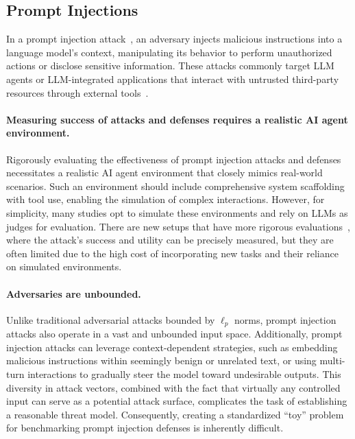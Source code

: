 \subsection{Prompt Injections} %
\label{sec:pi}

In a prompt injection attack~\citep{goodside,willison2023prompt}, 
an adversary injects malicious instructions into a language model’s context, manipulating its behavior to perform unauthorized actions or disclose sensitive information. These attacks commonly target LLM agents or LLM-integrated applications that interact with untrusted third-party resources through external tools~\citep{openai2024function,husain2024llama,anthropic2024tooluse}.




\paragraph{Measuring success of attacks and defenses requires a realistic AI agent environment.}
Rigorously evaluating the effectiveness of prompt injection attacks and defenses necessitates a realistic AI agent environment that closely mimics real-world scenarios. Such an environment should include comprehensive system scaffolding with tool use, enabling the simulation of complex interactions. However, for simplicity, many studies opt to simulate these environments and rely on LLMs as judges for evaluation.
There are new setups that have more rigorous evaluations~\citep{debenedetti2024agentdojo}, where the attack's success and utility can be precisely measured, but they are often limited due to the high cost of incorporating new tasks and their reliance on simulated environments.

\paragraph{Adversaries are unbounded.}
Unlike traditional adversarial attacks bounded by $\ell_p$ norms, prompt injection attacks also operate in a vast and unbounded input space. Additionally, prompt injection attacks can leverage context-dependent strategies, such as embedding malicious instructions within seemingly benign or unrelated text, or using multi-turn interactions to gradually steer the model toward undesirable outputs. This diversity in attack vectors, combined with the fact that virtually any controlled input can serve as a potential attack surface, complicates the task of establishing a reasonable threat model. Consequently, creating a standardized ``toy'' problem for benchmarking prompt injection defenses is inherently difficult. 


